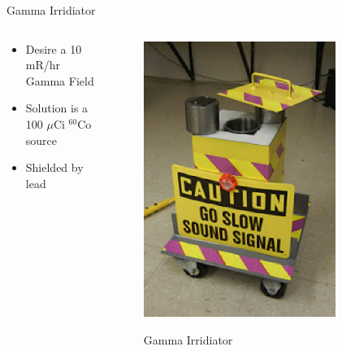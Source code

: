 \begin{frame}{Gamma Irridiator}
\begin{columns}[onlytextwidth]
\begin{column}{0.45\textwidth}
	\begin{itemize}
		\item Desire a 10 mR/hr Gamma Field
		\item Solution is a 100 $\mu$Ci ${}^{60}$Co source
		\item Shielded by lead
	\end{itemize}
\end{column}
\begin{column}{0.45\textwidth}
	\centering
	\begin{figure}
		\includegraphics[width=0.8\textwidth]{images/GammaIrridiator.eps}
		\label{fig:GammaIrridiator}
		\caption{Gamma Irridiator}
	\end{figure}
\end{column}
\end{columns}
\end{frame}

